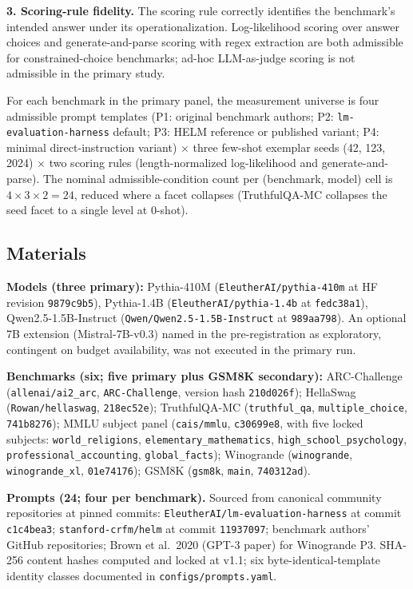 \documentclass[11pt]{article}
\begin{document}
\textbf{3. Scoring-rule fidelity.} The scoring rule correctly identifies the benchmark's intended answer under its operationalization. Log-likelihood scoring over answer choices and generate-and-parse scoring with regex extraction are both admissible for constrained-choice benchmarks; ad-hoc LLM-as-judge scoring is not admissible in the primary study.

For each benchmark in the primary panel, the measurement universe is four admissible prompt templates (P1: original benchmark authors; P2: \texttt{lm-evaluation-harness} default; P3: HELM reference or published variant; P4: minimal direct-instruction variant) $\times$ three few-shot exemplar seeds (42, 123, 2024) $\times$ two scoring rules (length-normalized log-likelihood and generate-and-parse). The nominal admissible-condition count per (benchmark, model) cell is $4 \times 3 \times 2 = 24$, reduced where a facet collapses (TruthfulQA-MC collapses the seed facet to a single level at $0$-shot).

\subsection{Materials}
\label{app:prereg-materials}

\textbf{Models (three primary):} Pythia-410M (\texttt{EleutherAI/pythia-410m} at HF revision \texttt{9879c9b5}), Pythia-1.4B (\texttt{EleutherAI/pythia-1.4b} at \texttt{fedc38a1}), Qwen2.5-1.5B-Instruct (\texttt{Qwen/Qwen2.5-1.5B-Instruct} at \texttt{989aa798}). An optional 7B extension (Mistral-7B-v0.3) named in the pre-registration as exploratory, contingent on budget availability, was not executed in the primary run.

\textbf{Benchmarks (six; five primary plus GSM8K secondary):} ARC-Challenge (\texttt{allenai/ai2\_arc}, \texttt{ARC-Challenge}, version hash \texttt{210d026f}); HellaSwag (\texttt{Rowan/hellaswag}, \texttt{218ec52e}); TruthfulQA-MC (\texttt{truthful\_qa}, \texttt{multiple\_choice}, \texttt{741b8276}); MMLU subject panel (\texttt{cais/mmlu}, \texttt{c30699e8}, with five locked subjects: \texttt{world\_religions}, \texttt{elementary\_mathematics}, \texttt{high\_school\_psychology}, \texttt{professional\_accounting}, \texttt{global\_facts}); Winogrande (\texttt{winogrande}, \texttt{winogrande\_xl}, \texttt{01e74176}); GSM8K (\texttt{gsm8k}, \texttt{main}, \texttt{740312ad}).

\textbf{Prompts (24; four per benchmark).} Sourced from canonical community repositories at pinned commits: \texttt{EleutherAI/lm-evaluation-harness} at commit \texttt{c1c4bea3}; \texttt{stanford-crfm/helm} at commit \texttt{11937097}; benchmark authors' GitHub repositories; Brown et al.\ 2020 (GPT-3 paper) for Winogrande P3. SHA-256 content hashes computed and locked at v1.1; six byte-identical-template identity classes documented in \texttt{configs/prompts.yaml}.
\end{document}
